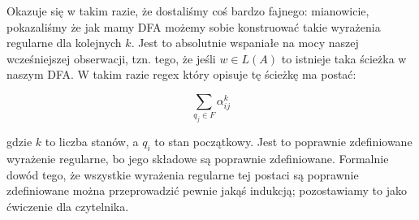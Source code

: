 Okazuje się w takim razie, że dostaliśmy coś bardzo fajnego: mianowicie, pokazaliśmy że jak mamy DFA możemy sobie konstruować takie wyrażenia regularne dla kolejnych \(k\). Jest to absolutnie wspaniałe na mocy naszej wcześniejszej obserwacji, tzn. tego, że jeśli \(w \in L(A) \) to istnieje taka ścieżka w naszym DFA. W takim razie regex który opisuje tę ścieżkę ma postać:

\[
	\sum_{q_j \in F} \alpha^{k}_{ij}
\]

gdzie \(k\) to liczba stanów, a \(q_i\) to stan początkowy. Jest to poprawnie zdefiniowane wyrażenie regularne, bo jego składowe są poprawnie zdefiniowane. Formalnie dowód tego, że wszystkie wyrażenia regularne tej postaci są poprawnie zdefiniowane można przeprowadzić pewnie jakąś indukcją; pozostawiamy to jako ćwiczenie dla czytelnika.
